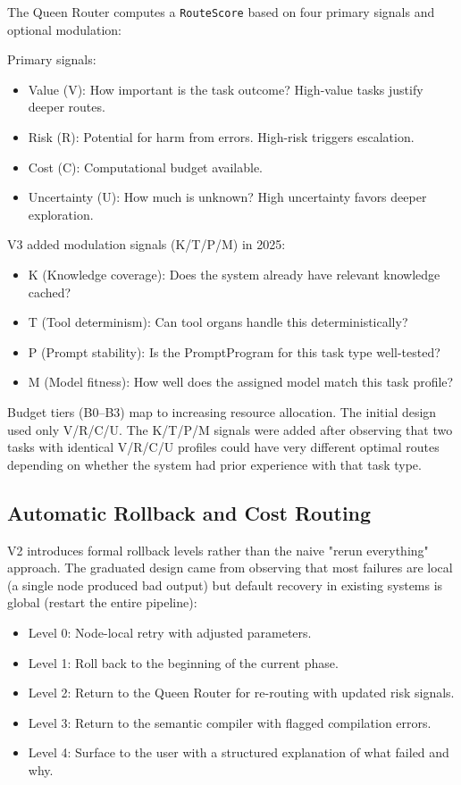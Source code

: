 \documentclass[12pt,a4paper]{article}
\begin{document}
The Queen Router computes a \texttt{RouteScore} based on four primary signals and optional modulation:

Primary signals:
\begin{itemize}
  \item Value (V): How important is the task outcome? High-value tasks justify deeper routes.
  \item Risk (R): Potential for harm from errors. High-risk triggers escalation.
  \item Cost (C): Computational budget available.
  \item Uncertainty (U): How much is unknown? High uncertainty favors deeper exploration.
\end{itemize}


V3 added modulation signals (K/T/P/M) in 2025:
\begin{itemize}
  \item K (Knowledge coverage): Does the system already have relevant knowledge cached?
  \item T (Tool determinism): Can tool organs handle this deterministically?
  \item P (Prompt stability): Is the PromptProgram for this task type well-tested?
  \item M (Model fitness): How well does the assigned model match this task profile?
\end{itemize}


Budget tiers (B0--B3) map to increasing resource allocation. The initial design used only V/R/C/U. The K/T/P/M signals were added after observing that two tasks with identical V/R/C/U profiles could have very different optimal routes depending on whether the system had prior experience with that task type.

\subsection{Automatic Rollback and Cost Routing}


V2 introduces formal rollback levels rather than the naive "rerun everything" approach. The graduated design came from observing that most failures are local (a single node produced bad output) but default recovery in existing systems is global (restart the entire pipeline):

\begin{itemize}
  \item Level 0: Node-local retry with adjusted parameters.
  \item Level 1: Roll back to the beginning of the current phase.
  \item Level 2: Return to the Queen Router for re-routing with updated risk signals.
  \item Level 3: Return to the semantic compiler with flagged compilation errors.
  \item Level 4: Surface to the user with a structured explanation of what failed and why.
\end{itemize}
\end{document}
